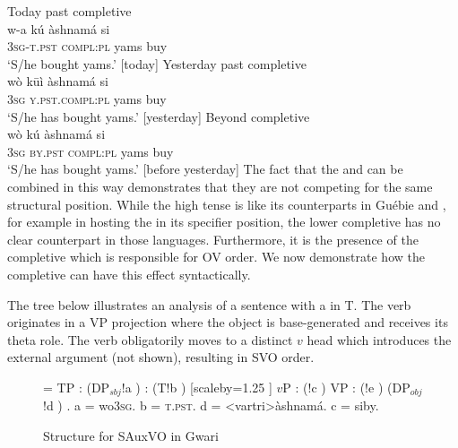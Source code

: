\documentclass[output=paper]{LSP/langsci}
\begin{document}
\ea \label{ex:14:gwari}
\ea \label{ex:14a:gwari} {Today past completive}	\\
\gll w-a k\'u \`ashnam\'a si  \\
3\textsc{sg}-\textsc{t.pst} \textsc{compl:pl} yams buy \\
\glt `S/he bought yams.' [today] \hfill \citep[][57]{hyman1970}
\ex \label{ex:14b:gwari} {Yesterday past completive}	\\
\gll w\`o  k\=u\`i \`ashnam\'a si  \\
3\textsc{sg} \textsc{y.pst}.\textsc{compl:pl} yams buy \\
\glt `S/he has bought yams.' [yesterday] \hfill \citep[][57]{hyman1970}
\ex \label{ex:14c:gwari}{Beyond  completive}	\\
\gll w\`o  k\'u \`ashnam\'a si  \\
3\textsc{sg} \textsc{by.pst} \textsc{compl:pl} yams buy \\
\glt `S/he has bought yams.' [before yesterday] \hfill \citep[][57]{hyman1970}
\z
\z
The fact that the  and  can be combined in this way demonstrates that they are not competing for the same structural position. While the high tense  is like its  counterparts in Gu\'ebie and , for example in hosting the  in its specifier position, the lower completive  has no clear counterpart in those languages. Furthermore, it is the presence of the completive which is responsible for OV order. We now demonstrate how the completive can have this effect syntactically.

The tree below illustrates an analysis of a  sentence with a   in T. The verb originates in a VP projection where the object is base-generated and receives its theta role. The verb obligatorily moves to a distinct $v$ head which introduces the external argument (not shown), resulting in SVO order.

\begin{figure}
{\scriptsize \jtree[xunit=2.5em,yunit=1.25em]
\! = {TP}
: ({DP$_{sbj}$}!a ) 
: ({T}!b ) [scaleby=1.25 ] {$v$P}
: ({}!c ) {VP}
: ({}!e ) ({DP$_{obj}$}!d ) .
\!a = {wo}{\textsc{3sg}}.
\!b = {}{\textsc{t.pst}}.
\!d = <vartri>{\`ashnam\'a}{}.
\!c = {si}{by}.
\endjtree}	

\caption{Structure for SAuxVO in Gwari}
\label{fig:sande:GwariVO}
\end{figure}
\end{document}
